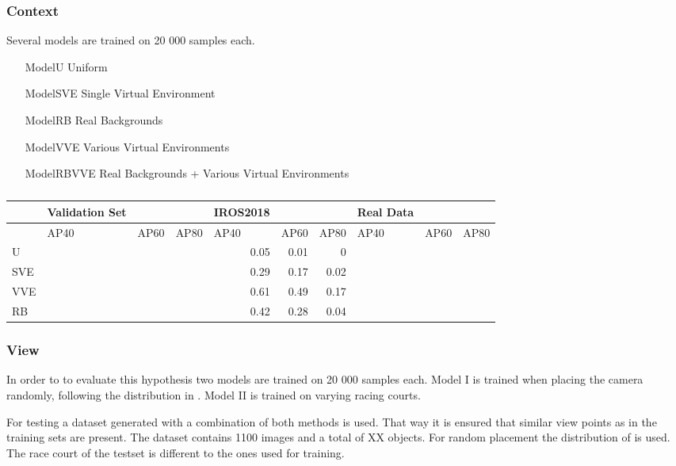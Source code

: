 \subsubsection{Context}

Several models are trained on 20 000 samples each.
\begin{itemize}
	\item[ModelU] Uniform
	\item[ModelSVE] Single Virtual Environment
	\item[ModelRB] Real Backgrounds
	\item[ModelVVE] Various Virtual Environments
	\item[ModelRBVVE] Real Backgrounds + Various Virtual Environments
\end{itemize}


\begin{table}[htbp]
	\caption{}
	\begin{tabular}{|l|l|l|l|r|r|r|l|l|l|}
		\hline
		& Validation Set &  &  & \multicolumn{1}{l|}{IROS2018} & \multicolumn{1}{l|}{} & \multicolumn{1}{l|}{} & Real Data &  &  \\ \hline
		& AP40 & AP60 & AP80 & \multicolumn{1}{l|}{AP40} & \multicolumn{1}{l|}{AP60} & \multicolumn{1}{l|}{AP80} & AP40 & AP60 & AP80 \\ \hline
		U &  &  &  & 0.05 & 0.01 & 0 &  &  &  \\ \hline
		SVE &  &  &  & 0.29 & 0.17 & 0.02 &  &  &  \\ \hline
		VVE &  &  &  & 0.61 & 0.49 & 0.17 &  &  &  \\ \hline
		RB &  &  &  & 0.42 & 0.28 & 0.04 &  &  &  \\ \hline
	\end{tabular}
	\label{tab:env}
\end{table}


\subsubsection{View}

In order to to evaluate this hypothesis two models are trained on 20 000 samples each. Model I is trained when placing the camera randomly, following the distribution in . Model II is trained on varying racing courts. 

For testing a dataset generated with a combination of both methods is used. That way it is ensured that similar view points as in the training sets are present. The dataset contains 1100 images and a total of XX objects. For random placement the distribution of  is used. The race court of the testset is different to the ones used for training. 

